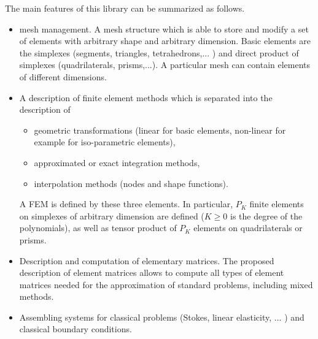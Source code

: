 \documentclass[11pt,a4paper]{article}
\begin{document}
The main features of this library can be summarized as follows.
\begin{itemize}
\item  mesh management. A mesh structure which is able to store and modify a
set of elements with arbitrary shape and arbitrary dimension. Basic elements
are the simplexes (segments, triangles, tetrahedrons,... ) and direct
product of simplexes (quadrilaterals, prisms,...). A particular mesh can
contain elements of different dimensions.

\item  A description of finite element methods which is separated into the
description of
\begin{itemize}
\item  geometric transformations (linear for basic elements,  non-linear for
example for iso-parametric elements),

\item  approximated or exact integration methods,

\item  interpolation methods (nodes and shape functions).
\end{itemize}

A FEM is defined by these three elements. In particular, $P_{K}$
finite elements on simplexes of arbitrary dimension are defined ($K\geq 0$
is the degree of the polynomials), as well as tensor product of $P_{K}$
elements on quadrilaterals or prisms.

\item  Description and computation of elementary matrices. The proposed
description of element matrices allows to compute all types of element
matrices needed for the approximation of standard problems, including mixed
methods.

\item  Assembling systems for classical problems (Stokes, linear elasticity,
... ) and classical boundary conditions.
\end{itemize}
\end{document}
